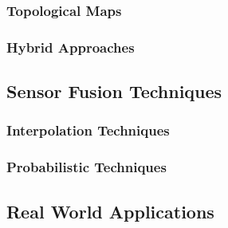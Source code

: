 \subsubsection{Topological Maps}


\subsubsection{Hybrid Approaches}




\subsection{Sensor Fusion Techniques}



\subsubsection{Interpolation Techniques}



\subsubsection{Probabilistic Techniques}





\subsection{Real World Applications}




